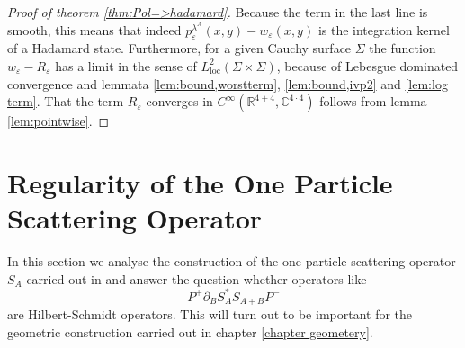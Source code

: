 \documentclass[b5paper,draft,openbib,12pt]{memoir}
\begin{document}
\begin{proof}[Proof of theorem \ref{thm:Pol=>hadamard}]
Because the term in the last line is smooth, this means that indeed \(p_\varepsilon^{\lambda^A}(x,y)-w_\varepsilon(x,y)\) is the integration kernel of a Hadamard state.
Furthermore, for a given Cauchy surface \(\Sigma\) the function \(w_\varepsilon-R_\varepsilon\) has a limit in the sense of \(L^2_{\text{loc}}(\Sigma\times\Sigma)\),
because of
Lebesgue dominated convergence and
lemmata \ref{lem:bound,worstterm}, \ref{lem:bound,ivp2} and  \ref{lem:log term}. That the term \(R_\varepsilon\) 
converges in \(C^\infty(\mathbb{R}^{4+4},\mathbb{C}^{4\cdot 4})\) follows from lemma \ref{lem:pointwise}.

\end{proof}



\section{Regularity of the One Particle Scattering Operator}
In this section we analyse the construction of the one particle 
scattering operator \(S_A\)
carried out in \cite{ivp0} and answer the question whether
operators like
\begin{equation}
P^+ \partial_B S_{A}^* S_{A+B}P^-
\end{equation}
are Hilbert-Schmidt operators. This will turn out to be important 
for the geometric construction carried out in 
chapter \ref{chapter geometery}. 
\end{document}
